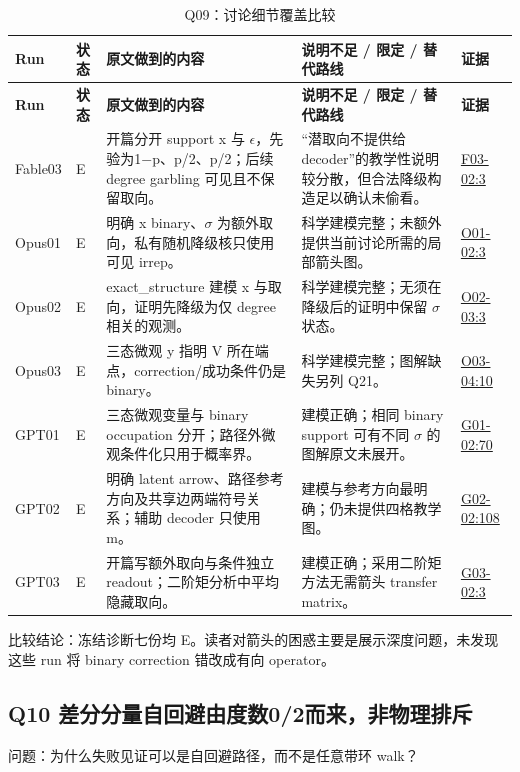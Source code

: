 \documentclass[11pt,a4paper]{article}
\begin{document}
{\fontsize{9.0}{12.6}\selectfont
\setlength{\tabcolsep}{2.5pt}
\begin{longtable}{>{\raggedright\arraybackslash}p{}>{\raggedright\arraybackslash}p{}>{\raggedright\arraybackslash}p{}>{\raggedright\arraybackslash}p{}>{\raggedright\arraybackslash}p{}}
\caption{Q09：讨论细节覆盖比较}\\
\toprule
\textbf{Run} & \textbf{状态} & \textbf{原文做到的内容} & \textbf{说明不足 / 限定 / 替代路线} & \textbf{证据}\tabularnewline
\midrule
\endfirsthead
\toprule
\textbf{Run} & \textbf{状态} & \textbf{原文做到的内容} & \textbf{说明不足 / 限定 / 替代路线} & \textbf{证据}\tabularnewline
\midrule
\endhead
{}Fable03 & E & 开篇分开 support x 与 \ensuremath{\epsilon}，先验为1\ensuremath{-}p、p/2、p/2；后续 degree garbling 可见且不保留取向。 & “潜取向不提供给 decoder”的教学性说明较分散，但合法降级构造足以确认未偷看。 & \hyperref[src:F03-02]{F03-02:3}\tabularnewline
{}Opus01 & E & 明确 x binary、\ensuremath{\sigma} 为额外取向，私有随机降级核只使用可见 irrep。 & 科学建模完整；未额外提供当前讨论所需的局部箭头图。 & \hyperref[src:O01-02]{O01-02:3}\tabularnewline
{}Opus02 & E & exact\_structure 建模 x 与取向，证明先降级为仅 degree 相关的观测。 & 科学建模完整；无须在降级后的证明中保留 \ensuremath{\sigma} 状态。 & \hyperref[src:O02-03]{O02-03:3}\tabularnewline
{}Opus03 & E & 三态微观 y 指明 V 所在端点，correction/成功条件仍是 binary。 & 科学建模完整；图解缺失另列 Q21。 & \hyperref[src:O03-04]{O03-04:10}\tabularnewline
{}GPT01 & E & 三态微观变量与 binary occupation 分开；路径外微观条件化只用于概率界。 & 建模正确；相同 binary support 可有不同 \ensuremath{\sigma} 的图解原文未展开。 & \hyperref[src:G01-02]{G01-02:70}\tabularnewline
{}GPT02 & E & 明确 latent arrow、路径参考方向及共享边两端符号关系；辅助 decoder 只使用 m。 & 建模与参考方向最明确；仍未提供四格教学图。 & \hyperref[src:G02-02]{G02-02:108}\tabularnewline
{}GPT03 & E & 开篇写额外取向与条件独立 readout；二阶矩分析中平均隐藏取向。 & 建模正确；采用二阶矩方法无需箭头 transfer matrix。 & \hyperref[src:G03-02]{G03-02:3}\tabularnewline
\bottomrule
\end{longtable}
}
比较结论：冻结诊断七份均 E。读者对箭头的困惑主要是展示深度问题，未发现这些 run 将 binary correction 错改成有向 operator。

\clearpage
\subsection{Q10 差分分量自回避由度数0/2而来，非物理排斥}
\label{aspect:Q10}
问题：为什么失败见证可以是自回避路径，而不是任意带环 walk？
\end{document}
